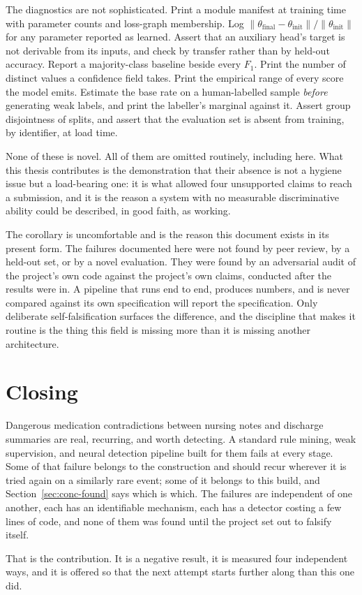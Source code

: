 The diagnostics are not sophisticated. Print a module manifest at training time
with parameter counts and loss-graph membership. Log
$\lVert\theta_{\text{final}} - \theta_{\text{init}}\rVert /
\lVert\theta_{\text{init}}\rVert$ for any parameter reported as learned. Assert
that an auxiliary head's target is not derivable from its inputs, and check by
transfer rather than by held-out accuracy. Report a majority-class baseline
beside every $F_1$. Print the number of distinct values a confidence field takes.
Print the empirical range of every score the model emits. Estimate the base rate
on a human-labelled sample \emph{before} generating weak labels, and print the
labeller's marginal against it. Assert group disjointness of splits, and assert
that the evaluation set is absent from training, by identifier, at load time.

None of these is novel. All of them are omitted routinely, including here. What
this thesis contributes is the demonstration that their absence is not a hygiene
issue but a load-bearing one: it is what allowed four unsupported claims to
reach a submission, and it is the reason a system with no measurable
discriminative ability could be described, in good faith, as working.

The corollary is uncomfortable and is the reason this document exists in its
present form. The failures documented here were not found by peer review, by a
held-out set, or by a novel evaluation. They were found by an adversarial audit
of the project's own code against the project's own claims, conducted after the
results were in. A pipeline that runs end to end, produces numbers, and is never
compared against its own specification will report the specification. Only
deliberate self-falsification surfaces the difference, and the discipline that
makes it routine is the thing this field is missing more than it is missing
another architecture.

\section{Closing}
\label{sec:conc-closing}

Dangerous medication contradictions between nursing notes and discharge
summaries are real, recurring, and worth detecting. A standard rule mining,
weak supervision, and neural detection pipeline built for them fails at every
stage. Some of that failure belongs to the construction and should recur
wherever it is tried again on a similarly rare event; some of it belongs to
this build, and Section~\ref{sec:conc-found} says which is which. The
failures are independent of
one another, each has an identifiable mechanism, each has a detector costing a
few lines of code, and none of them was found until the project set out to
falsify itself.

That is the contribution. It is a negative result, it is measured four
independent ways, and it is offered so that the next attempt starts further
along than this one did.
